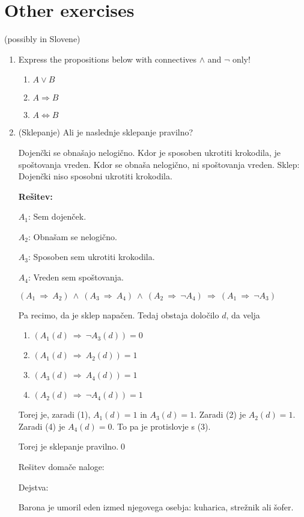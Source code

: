 \documentclass[11pt,paper=b5,footinclude,headinclude]{scrbook} %
\def\inn {{~\wedge~}}
\def\sledi {{~\Rightarrow~}}
\theoremstyle{remark}
\theoremstyle{definition} %
\theoremstyle{theorem} %
\begin{document}
\section{Other exercises}
(possibly in Slovene)
\begin{enumerate}

\item Express the propositions below with connectives $\wedge$ and $\neg$
only!
\begin{enumerate}
\item $A\vee B$
\item $A\Rightarrow B$
\item $A\Leftrightarrow B$
\end{enumerate}

\item (Sklepanje)
Ali je naslednje sklepanje pravilno?

Dojenčki se obnašajo nelogično. Kdor je sposoben ukrotiti krokodila, je spoštovanja vreden.
Kdor se obnaša nelogično, ni spoštovanja vreden. Sklep: Dojenčki niso sposobni ukrotiti krokodila.


\textbf{Rešitev:}

$A_1$: Sem dojenček.

$A_2$: Obnašam se nelogično.

$A_3$: Sposoben sem ukrotiti krokodila.

$A_4$: Vreden sem spoštovanja.

$(A_1\sledi A_2)\inn (A_3\sledi A_4) \inn (A_2\sledi \neg A_4)\sledi (A_1\sledi \neg A_3)$

Pa recimo, da je sklep napačen. Tedaj obstaja določilo $d$, da velja
\begin{enumerate}[(1)]
  \item $(A_1(d)\sledi \neg A_3(d)) = 0$
  \item $(A_1(d)\sledi A_2(d)) = 1$
  \item $(A_3(d)\sledi A_4(d)) = 1$
  \item $(A_2(d)\sledi \neg A_4(d)) = 1$
\end{enumerate}
Torej je, zaradi (1), $A_1(d) = 1$ in $A_3(d) = 1$. Zaradi (2) je $A_2(d) = 1$.
Zaradi (4) je $A_4(d) = 0$. To pa je protislovje s (3).

Torej je sklepanje pravilno.\qed


\bigskip
Rešitev domače naloge:

Dejstva:

Barona je umoril eden izmed njegovega osebja: kuharica, strežnik ali šofer.


\end{enumerate}
\end{document}
